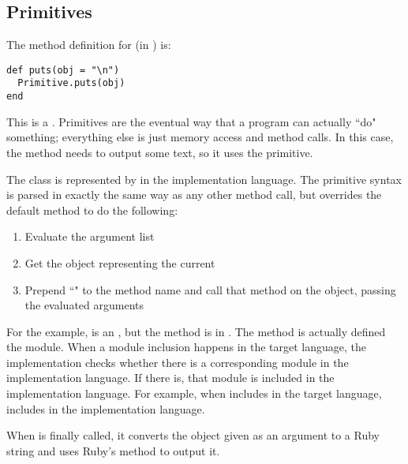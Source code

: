 \subsection{Primitives}

The method definition for  (in ) is:

\begin{lstlisting}
def puts(obj = "\n")
  Primitive.puts(obj)
end
\end{lstlisting}

This is a . Primitives are the eventual way that a program can actually ``do" something; everything else is just memory access and method calls. In this case, the  method needs to output some text, so it uses the  primitive.

The  class is represented by  in the implementation language. The primitive syntax is parsed in exactly the same way as any other method call, but  overrides the default  method to do the following:

\begin{enumerate}
  \item Evaluate the argument list
  \item Get the object representing the current 
  \item Prepend ``" to the method name and call that method on the object, passing the evaluated arguments
\end{enumerate}

For the example,  is an , but the method is in . The  method is actually defined the  module. When a module inclusion happens in the target language, the implementation checks whether there is a corresponding module in the implementation language. If there is, that module is included in the implementation language. For example, when  includes  in the target language,  includes  in the implementation language.

When  is finally called, it converts the object given as an argument to a Ruby string and uses Ruby's  method to output it.
